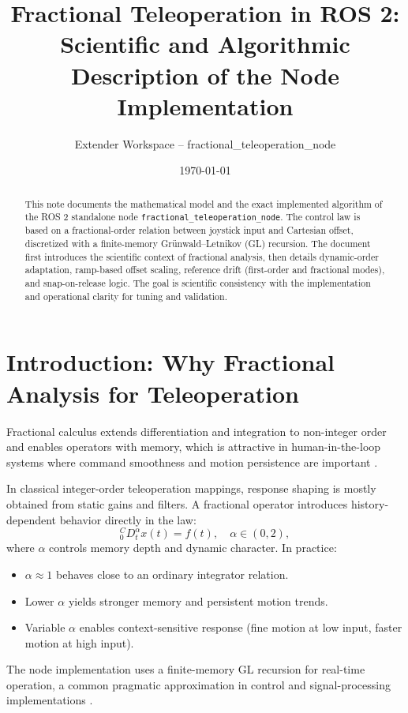 \documentclass[11pt,a4paper]{article}
\title{Fractional Teleoperation in ROS 2:\\Scientific and Algorithmic Description of the Node Implementation}
\author{Extender Workspace -- fractional\_teleoperation\_node}
\date{\today}
\begin{document}
\maketitle

\begin{abstract}
This note documents the mathematical model and the exact implemented algorithm of the ROS 2 standalone node
\texttt{fractional\_teleoperation\_node}. The control law is based on a fractional-order relation between joystick input
and Cartesian offset, discretized with a finite-memory Gr\"unwald--Letnikov (GL) recursion.
The document first introduces the scientific context of fractional analysis, then details dynamic-order adaptation,
ramp-based offset scaling, reference drift (first-order and fractional modes), and snap-on-release logic.
The goal is scientific consistency with the implementation and operational clarity for tuning and validation.
\end{abstract}

\section{Introduction: Why Fractional Analysis for Teleoperation}
Fractional calculus extends differentiation and integration to non-integer order and enables operators with memory,
which is attractive in human-in-the-loop systems where command smoothness and motion persistence are important
\cite{oldham_spanier_1974,podlubny_1999,monje_2010,diethelm_2010}.

In classical integer-order teleoperation mappings, response shaping is mostly obtained from static gains and filters.
A fractional operator introduces history-dependent behavior directly in the law:
\begin{equation}
{}^{C}_{0}D_t^{\alpha} x(t) = f(t), \quad \alpha \in (0,2),
\end{equation}
where $\alpha$ controls memory depth and dynamic character. In practice:
\begin{itemize}[leftmargin=*]
\item $\alpha \approx 1$ behaves close to an ordinary integrator relation.
\item Lower $\alpha$ yields stronger memory and persistent motion trends.
\item Variable $\alpha$ enables context-sensitive response (fine motion at low input, faster motion at high input).
\end{itemize}

The node implementation uses a finite-memory GL recursion for real-time operation, a common pragmatic approximation
in control and signal-processing implementations \cite{podlubny_1999,oustaloup_2000}.
\end{document}
